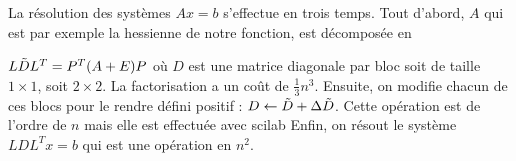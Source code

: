 La r\'esolution des syst\`emes $Ax=b$ s'effectue en trois temps. Tout d'abord, $A$ qui est par exemple 
la hessienne de notre fonction, est d\'ecompos\'ee en

 $L\Tilde{D}L^T=P^T(A+E)P$ o\`u $D$ est une matrice diagonale par bloc soit de taille $1\times 1$, soit $2\times 2$.
 La factorisation a un coût de $\frac{1}{3}n^3$. Ensuite, on modifie chacun de ces blocs
pour le rendre d\'efini positif : $D\leftarrow \Tilde{D}+\Delta \Tilde{D}$. Cette op\'eration est 
de l'ordre de $n$ mais elle est effectu\'ee avec scilab
 Enfin, on r\'esout le syst\`eme $LDL^Tx=b$ qui est une op\'eration en $n^2$.








